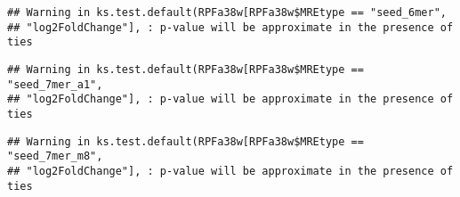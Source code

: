 \documentclass[
]{article}
\newenvironment{Shaded}{\begin{snugshade}}{\end{snugshade}}
\newcommand{\FunctionTok}[1]{\textcolor[rgb]{0.13,0.29,0.53}{\textbf{#1}}}
\newcommand{\NormalTok}[1]{#1}
\newcommand{\OtherTok}[1]{\textcolor[rgb]{0.56,0.35,0.01}{#1}}
\newcommand{\SpecialCharTok}[1]{\textcolor[rgb]{0.81,0.36,0.00}{\textbf{#1}}}
\newcommand{\StringTok}[1]{\textcolor[rgb]{0.31,0.60,0.02}{#1}}
\begin{document}
\begin{verbatim}
## Warning in ks.test.default(RPFa38w[RPFa38w$MREtype == "seed_6mer",
## "log2FoldChange"], : p-value will be approximate in the presence of ties
\end{verbatim}

\begin{Shaded}
\end{Shaded}

\begin{verbatim}
## Warning in ks.test.default(RPFa38w[RPFa38w$MREtype == "seed_7mer_a1",
## "log2FoldChange"], : p-value will be approximate in the presence of ties
\end{verbatim}

\begin{Shaded}
\end{Shaded}

\begin{verbatim}
## Warning in ks.test.default(RPFa38w[RPFa38w$MREtype == "seed_7mer_m8",
## "log2FoldChange"], : p-value will be approximate in the presence of ties
\end{verbatim}

\begin{Shaded}
\end{Shaded}
\end{document}
